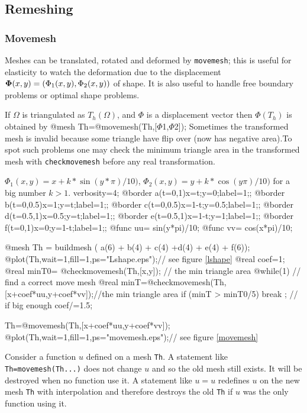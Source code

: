 \documentclass[a4paper,twoside,12pt]{book}
\def\vec#1{\mbox{\boldmath $#1$}}
\def\setS#1{#1\label{sec:#1}}
\begin{document}
\subsection{Remeshing}
\subsubsection{\setS{Movemesh}}

Meshes can be translated, rotated and deformed by {\tt movemesh}; this is useful for
 elasticity to watch the deformation due to the displacement
$\vec\Phi(x,y)=(\Phi_1(x,y),\Phi_2(x,y))$ of shape. It is also useful to
handle free boundary  problems or optimal shape problems.

If $\Omega$ is triangulated as $T_h(\Omega)$,
and $\Phi$ is a displacement vector then $\Phi(T_h)$ is obtained by
\bFF
@mesh  Th=@movemesh(Th,[$\Phi$1,$\Phi$2]);
\eFF
Sometimes the transformed mesh is invalid because some triangle
have flip over (now has negative area).To spot such problems one may check the
minimum triangle area in the transformed mesh with
\texttt{checkmovemesh} before any real transformation.

\begin{example} $\Phi_1(x,y)=x+k*\sin(y*\pi)/10)$,
$\Phi_2(x,y)=y+k*\cos(y\pi)/10)$ for a big number $k>1$.
\bFF
verbosity=4;
@border a(t=0,1){x=t;y=0;label=1;};
@border b(t=0,0.5){x=1;y=t;label=1;};
@border c(t=0,0.5){x=1-t;y=0.5;label=1;};
@border d(t=0.5,1){x=0.5;y=t;label=1;};
@border e(t=0.5,1){x=1-t;y=1;label=1;};
@border f(t=0,1){x=0;y=1-t;label=1;};
@func uu= sin(y*pi)/10;
@func vv= cos(x*pi)/10;

@mesh Th = buildmesh ( a(6) + b(4) + c(4) +d(4) + e(4) + f(6));
@plot(Th,wait=1,fill=1,ps="Lshape.eps");// see figure \ref{lshape}
@real coef=1;
@real minT0= @checkmovemesh(Th,[x,y]); // the min triangle area
@while(1) // find a correct move mesh
{
  @real minT=@checkmovemesh(Th,[x+coef*uu,y+coef*vv]);//the min triangle area
  if (minT > minT0/5) break ; // if big enough
  coef/=1.5;
}

Th=@movemesh(Th,[x+coef*uu,y+coef*vv]);
@plot(Th,wait=1,fill=1,ps="movemesh.eps");// see figure \ref{movemesh}
\eFF

\end{example}
\begin{note}
Consider a function $u$ defined on a mesh \texttt{Th}. A statement like
\texttt{Th=movemesh(Th...)} does not change $u$ and so the old mesh
still exists. It will be destroyed when no function use it. A
statement like $u=u$ redefines $u$ on the new mesh \texttt{Th} with
interpolation and therefore destroys the old \texttt{Th} if $u$ was the only
function using it.
\end{note}
\end{document}
